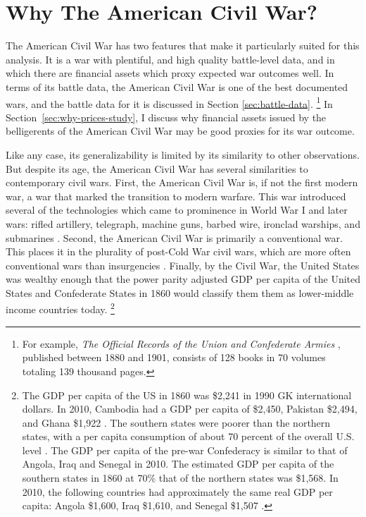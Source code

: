 \section{Why The American Civil War?}
\label{sec:why-american-civil}

The American Civil War has two features that make it particularly suited for this analysis.
It is a war with plentiful, and high quality battle-level data, and in which there are financial assets which proxy expected war outcomes well.
In terms of its battle data, the American Civil War is one of the best documented wars, and the battle data for it is discussed in Section \ref{sec:battle-data}.
\footnote{%
  For example, \textit{The Official Records of the Union and  Confederate Armies} \parencites{US1901}, published between 1880 and 1901, consists of 128 books in 70 volumes totaling 139 thousand pages.

} %
In Section~\ref{sec:why-prices-study}, I discuss why financial assets issued by the belligerents of the American Civil War may be good proxies for its war outcome.

Like any case, its generalizability is limited by its similarity to other observations.
But despite its age, the American Civil War has several similarities to contemporary civil wars.
First, the American Civil War is, if not the first modern war, a war that marked the transition to modern warfare.
This war introduced several of the technologies which came to prominence in World War I and later wars: rifled artillery, telegraph, machine guns, barbed wire, ironclad warships, and submarines \parencites[89]{Fuller1956a}[760]{Weiss1966}.
Second, the American Civil War is primarily a conventional war.
This places it in the plurality of post-Cold War civil wars, which are more often conventional wars than insurgencies \parencite[423]{kalyvas2010inter}. %
Finally, by the Civil War, the United States was wealthy enough that the power parity adjusted GDP per capita of the United States and Confederate States in 1860 would classify them them as lower-middle income countries today.%
\footnote{%
  The GDP per capita of the US in 1860 was \$2,241 in 1990 GK international dollars. %
  In 2010, Cambodia had a GDP per capita of \$2,450, Pakistan \$2,494, and Ghana \$1,922 \parencite{BoltZanden2013}. %
  The southern states were poorer than the northern states, with a per capita consumption of about 70 percent of the overall U.S. level \parencite[324]{GoldinLewis1975}.
  The GDP per capita of the pre-war Confederacy is similar to that of Angola, Iraq and Senegal in 2010.%
  The estimated GDP per capita of the southern states in 1860 at 70\% that of the northern states was \$1,568. %
  In 2010, the following countries had approximately the same real GDP per capita: Angola \$1,600, Iraq \$1,610, and Senegal \$1,507 \parencite{BoltZanden2013}. %
}

